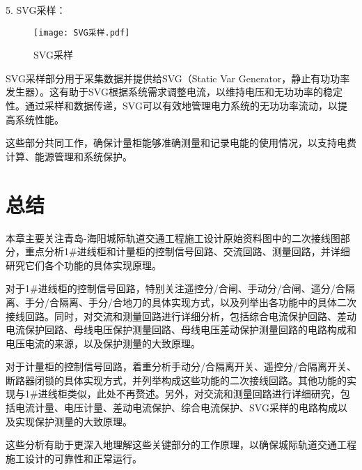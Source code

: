 5. SVG采样：

\begin{figure}[h]
	\centering
	\texttt{[image: SVG采样.pdf]}
	\caption{SVG采样}
	\label{SVG采样}
\end{figure}

SVG采样部分用于采集数据并提供给SVG（Static Var Generator，静止有功功率发生器）。这有助于SVG根据系统需求调整电流，以维持电压和无功功率的稳定性。通过采样和数据传递，SVG可以有效地管理电力系统的无功功率流动，以提高系统性能。

这些部分共同工作，确保计量柜能够准确测量和记录电能的使用情况，以支持电费计算、能源管理和系统保护。

\section{总结}
本章主要关注青岛-海阳城际轨道交通工程施工设计原始资料图中的二次接线图部分，重点分析1\#进线柜和计量柜的控制信号回路、交流回路、测量回路，并详细研究它们各个功能的具体实现原理。

对于1\#进线柜的控制信号回路，特别关注遥控分/合闸、手动分/合闸、遥分/合隔离、手分/合隔离、手分/合地刀的具体实现方式，以及列举出各功能中的具体二次接线回路。同时，对交流和测量回路进行详细分析，包括综合电流保护回路、差动电流保护回路、母线电压保护测量回路、母线电压差动保护测量回路的电路构成和电压电流的来源，以及保护测量的大致原理。

对于计量柜的控制信号回路，着重分析手动分/合隔离开关、遥控分/合隔离开关、断路器闭锁的具体实现方式，并列举构成这些功能的二次接线回路。其他功能的实现与1\#进线柜类似，此处不再赘述。另外，对交流和测量回路进行详细研究，包括电流计量、电压计量、差动电流保护、综合电流保护、SVG采样的电路构成以及实现保护测量的大致原理。

这些分析有助于更深入地理解这些关键部分的工作原理，以确保城际轨道交通工程施工设计的可靠性和正常运行。

